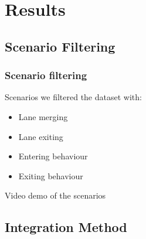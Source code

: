 
\section{Results}

\subsection{Scenario Filtering}

\begin{frame}
  \frametitle{Scenario filtering}
    Scenarios we filtered the dataset with:
    \begin{itemize}[<+->]
      \item Lane merging
      \item Lane exiting 
      \item Entering behaviour
      \item Exiting behaviour
    \end{itemize}
\end{frame}

\begin{frame}
    \center Video demo of the scenarios
\end{frame}


\subsection{Integration Method}

